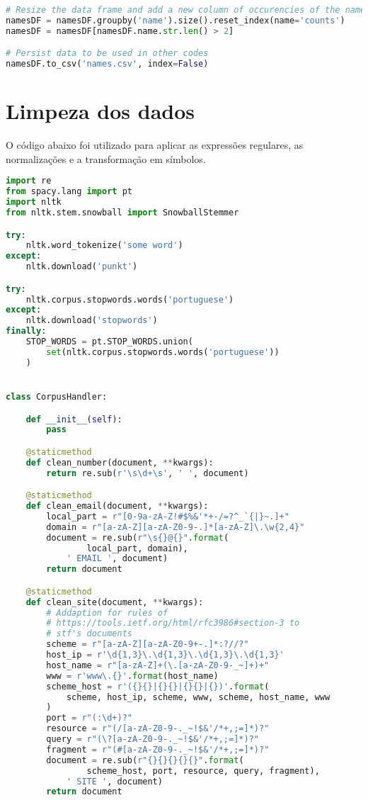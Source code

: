 \begin{apendicesenv}
\begin{lstlisting}[language=Python]
# Resize the data frame and add a new column of occurencies of the name 
namesDF = namesDF.groupby('name').size().reset_index(name='counts')
namesDF = namesDF[namesDF.name.str.len() > 2]

# Persist data to be used in other codes
namesDF.to_csv('names.csv', index=False)
\end{lstlisting}


\chapter{Limpeza dos dados}
\label{sec:apendiceB}

O código abaixo foi utilizado para aplicar as expressões regulares, as normalizações e a transformação em símbolos.

\begin{lstlisting}[language=Python,extendedchars=true]
import re
from spacy.lang import pt
import nltk
from nltk.stem.snowball import SnowballStemmer

try:
    nltk.word_tokenize('some word')
except:
    nltk.download('punkt')

try:
    nltk.corpus.stopwords.words('portuguese')
except:
    nltk.download('stopwords')
finally:
    STOP_WORDS = pt.STOP_WORDS.union(
        set(nltk.corpus.stopwords.words('portuguese'))
    )


class CorpusHandler:

    def __init__(self):
        pass

    @staticmethod
    def clean_number(document, **kwargs):
        return re.sub(r'\s\d+\s', ' ', document)

    @staticmethod
    def clean_email(document, **kwargs):
        local_part = r"[0-9a-zA-Z!#$%&'*+-/=?^_`{|}~.]+"
        domain = r"[a-zA-Z][a-zA-Z0-9-.]*[a-zA-Z]\.\w{2,4}"
        document = re.sub(r"\s{}@{}".format(
                local_part, domain),
            ' EMAIL ', document)
        return document

    @staticmethod
    def clean_site(document, **kwargs):
        # Addaption for rules of
        # https://tools.ietf.org/html/rfc3986#section-3 to
        # stf's documents
        scheme = r"[a-zA-Z][a-zA-Z0-9+-.]*:?//?"
        host_ip = r'\d{1,3}\.\d{1,3}\.\d{1,3}\.\d{1,3}'
        host_name = r"[a-zA-Z]+(\.[a-zA-Z0-9-_~]+)+"
        www = r'www\.{}'.format(host_name)
        scheme_host = r'({}{}|{}{}|{}{}|{})'.format(
            scheme, host_ip, scheme, www, scheme, host_name, www
        )
        port = r"(:\d+)?"
        resource = r"(/[a-zA-Z0-9-._~!$&'/*+,;=]*)?"
        query = r"(\?[a-zA-Z0-9-._~!$&'/*+,;=]*)?"
        fragment = r"(#[a-zA-Z0-9-._~!$&'/*+,;=]*)?"
        document = re.sub(r"{}{}{}{}{}".format(
                scheme_host, port, resource, query, fragment),
            ' SITE ', document)
        return document


\end{lstlisting}
\end{apendicesenv}
